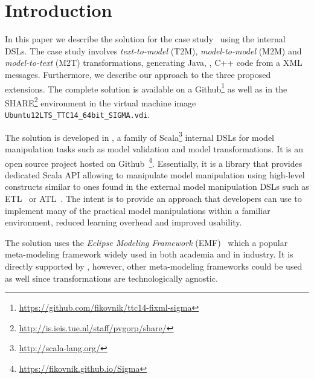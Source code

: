 
\section{Introduction}
\label{sec:Introduction}

In this paper we describe the solution for the \TTC \FIXML case study~\cite{Lano2014} using the \SIGMA internal DSLs.
The case study involves \emph{text-to-model} (T2M), \emph{model-to-model} (M2M) and \emph{model-to-text} (M2T) transformations, generating Java, \Csharp, C++ code from a \FIXML XML messages.
Furthermore, we describe our approach to the three proposed extensions.
The complete solution is available on a Github\footnote{\url{https://github.com/fikovnik/ttc14-fixml-sigma}} as well as in the SHARE\footnote{\url{http://is.ieis.tue.nl/staff/pvgorp/share/}} environment in the virtual machine image \texttt{Ubuntu12LTS\_TTC14\_64bit\_SIGMA.vdi}.

The solution is developed in \SIGMA, a family of Scala\footnote{\url{http://scala-lang.org/}} internal DSLs for model manipulation tasks such as model validation and model transformations.
It is an open source project hosted on Github~\footnote{\url{https://fikovnik.github.io/Sigma}}.
Essentially, it is a library that provides dedicated Scala API allowing to manipulate model manipulation using high-level constructs similar to ones found in the external model manipulation DSLs such as ETL~\cite{Kolovos2008a} or ATL~\cite{Jouault2006}.
The intent is to provide an approach that developers can use to implement many of the practical model manipulations within a familiar environment, reduced learning overhead and improved usability.

The solution uses the \emph{Eclipse Modeling Framework} (EMF)~\cite{EMF} which a popular meta-modeling framework widely used in both academia and in industry.
It is directly supported by \SIGMA, however, other meta-modeling frameworks could be used as well since \SIGMA transformations are technologically agnostic.

